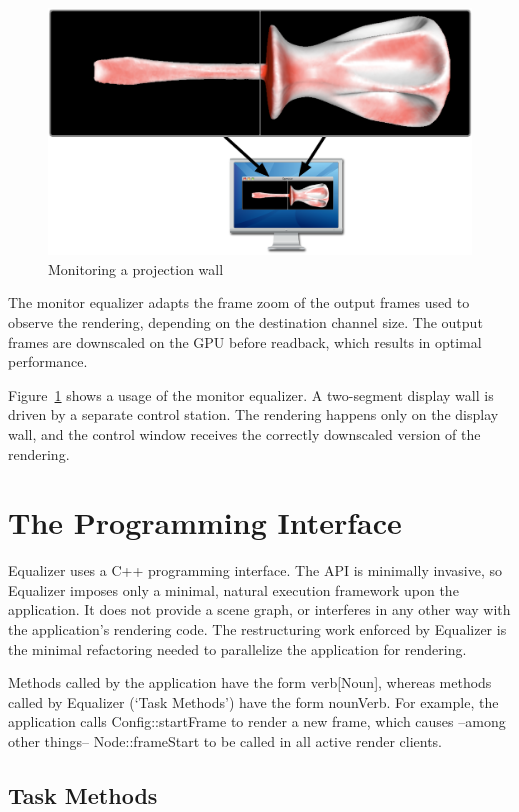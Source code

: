 \documentclass[10pt,a4]{scrartcl}
\newcommand{\fig}[1]{Figure~\ref{#1}}
\begin{document}
\begin{figure}
  \includegraphics[width=.618\textwidth]{images/monitorEq.pdf}
  {\caption{\label{fMonitorEq}\small Monitoring a projection wall}}
\end{figure}
The monitor equalizer adapts the frame zoom of the output frames used to
observe the rendering, depending on the destination channel size. The
output frames are downscaled on the GPU before readback, which results
in optimal performance.

\fig{fMonitorEq} shows a usage of the monitor equalizer. A two-segment
display wall is driven by a separate control station. The rendering
happens only on the display wall, and the control window receives the
correctly downscaled version of the rendering.

\section{The Programming Interface}

Equalizer uses a C++ programming interface. The API is minimally
invasive, so Equalizer imposes only a minimal, natural execution
framework upon the application. It does not provide a scene graph, or
interferes in any other way with the application's rendering code. The
restructuring work enforced by Equalizer is the minimal refactoring
needed to parallelize the application for rendering.

Methods called by the application have the form \textsf{verb[Noun]},
whereas methods called by Equalizer (`Task Methods') have the form
\textsf{nounVerb}. For example, the application calls
\textsf{Config::startFrame} to render a new frame, which causes --among
other things-- \textsf{Node::frameStart} to be called in all active
render clients.


\subsection{\label{sTaskMethods}Task Methods}
\end{document}
